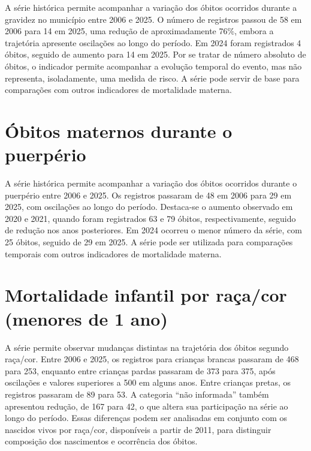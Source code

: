 A série histórica permite acompanhar a variação dos óbitos ocorridos durante a gravidez no município entre 2006 e 2025. O número de registros passou de 58 em 2006 para 14 em 2025, uma redução de aproximadamente 76\%, embora a trajetória apresente oscilações ao longo do período. Em 2024 foram registrados 4 óbitos, seguido de aumento para 14 em 2025. Por se tratar de número absoluto de óbitos, o indicador permite acompanhar a evolução temporal do evento, mas não representa, isoladamente, uma medida de risco. A série pode servir de base para comparações com outros indicadores de mortalidade materna.


\section{Óbitos maternos durante o puerpério}


A série histórica permite acompanhar a variação dos óbitos ocorridos durante o puerpério entre 2006 e 2025. Os registros passaram de 48 em 2006 para 29 em 2025, com oscilações ao longo do período. Destaca-se o aumento observado em 2020 e 2021, quando foram registrados 63 e 79 óbitos, respectivamente, seguido de redução nos anos posteriores. Em 2024 ocorreu o menor número da série, com 25 óbitos, seguido de 29 em 2025. A série pode ser utilizada para comparações temporais com outros indicadores de mortalidade materna.


\section{Mortalidade infantil por raça/\allowbreak{}cor (menores de 1 ano)}


A série permite observar mudanças distintas na trajetória dos óbitos segundo raça/cor. Entre 2006 e 2025, os registros para crianças brancas passaram de 468 para 253, enquanto entre crianças pardas passaram de 373 para 375, após oscilações e valores superiores a 500 em alguns anos. Entre crianças pretas, os registros passaram de 89 para 53. A categoria “não informada” também apresentou redução, de 167 para 42, o que altera sua participação na série ao longo do período. Essas diferenças podem ser analisadas em conjunto com os nascidos vivos por raça/cor, disponíveis a partir de 2011, para distinguir composição dos nascimentos e ocorrência dos óbitos.


